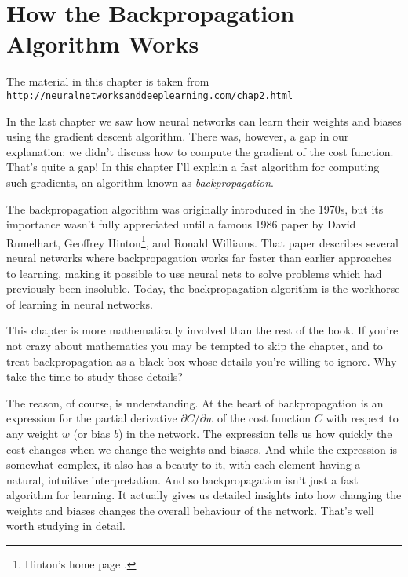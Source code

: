 
\chapter{How the Backpropagation Algorithm Works}


The material in this chapter is taken from\\
\lstinline{http://neuralnetworksanddeeplearning.com/chap2.html}

In the last chapter we saw how neural networks can learn their weights and biases using the gradient descent algorithm. There was, however, a gap in our explanation: we didn't discuss how to compute the gradient of the cost function. That's quite a gap! In this chapter I'll explain a fast algorithm for computing such gradients, an algorithm known as \textit{backpropagation}. 


The backpropagation algorithm was originally introduced in the 1970s, but its importance wasn't fully appreciated until a famous 1986 paper \cite{rumelhart1986} by David Rumelhart, Geoffrey Hinton\footnote{Hinton's home page \cite{Hinton2019}.}, and Ronald Williams. That paper describes several neural networks where backpropagation works far faster than earlier approaches to learning, making it possible to use neural nets to solve problems which had previously been insoluble. Today, the backpropagation algorithm is the workhorse of learning in neural networks.


This chapter is more mathematically involved than the rest of the book. If you're not crazy about mathematics you may be tempted to skip the chapter, and to treat backpropagation as a black box whose details you're willing to ignore. Why take the time to study those details?

The reason, of course, is understanding. At the heart of backpropagation is an expression for the partial derivative $\partial C / \partial w$ of the cost function $C$ with respect to any weight $w$ (or bias $b$) in the network. The expression tells us how quickly the cost changes when we change the weights and biases. And while the expression is somewhat complex, it also has a beauty to it, with each element having a natural, intuitive interpretation. And so backpropagation isn't just a fast algorithm for learning. It actually gives us detailed insights into how changing the weights and biases changes the overall behaviour of the network. That's well worth studying in detail.

